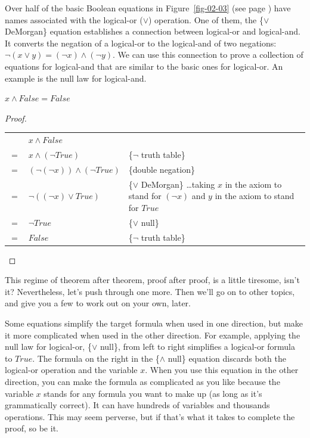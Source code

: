 Over half of the basic Boolean equations in Figure~\ref{fig-02-03} (see page \pageref{fig-02-03})
have names associated with the logical-or ($\vee$) operation.
One of them, the
\{$\vee$ DeMorgan\} equation establishes a connection between logical-or and logical-and.
It converts the negation of a logical-or to the logical-and of two negations:
$\neg(x \vee y) = (\neg x) \wedge (\neg y)$.
We can use this connection to prove a collection of equations for logical-and that are similar to the basic ones for logical-or.
An example is the null law for logical-and.

\begin{theorem}
$x \wedge False = False$
\end{theorem}

\begin{proof}
\mbox{} \\
\begin{tabular}{llp{3.15in}}
    & $x \wedge False$                       & \\
$=$ & $x \wedge (\neg True)$                 & \{$\neg$ truth table\} \\
$=$ & $(\neg (\neg x)) \wedge (\neg True)$   & \{double negation\} \\
$=$ & $\neg ((\neg x) \vee True)$            & \{$\vee$ DeMorgan\} \dots taking $x$ in the axiom to stand for $(\neg x)$ and $y$ in the axiom to stand for $True$  \\
$=$ & $\neg True$                            & \{$\vee$ null\} \\
$=$ & $False$                                & \{$\neg$ truth table\} \\
\end{tabular}

\end{proof}

This regime of theorem after theorem, proof after proof, is a little tiresome, isn't it?
Nevertheless, let's push through one more.
Then we'll go on to other topics, and give you a few to work out on your own, later.

Some equations simplify the target formula when used in one direction,
but make it more complicated when used in the other direction.
For example, applying
the null law for logical-or, \{$\vee$ null\}, from left to right simplifies a logical-or formula to $True$.
The formula on the right in the \{$\wedge$ null\} equation discards both the logical-or operation and the variable $x$.
When you use this equation in the other direction, you can make the formula as complicated as you like because the variable $x$ stands for any formula you want to make up (as long as it's grammatically correct).
It can have hundreds of variables and thousands operations.
This may seem perverse, but if that's what it takes to complete the proof, so be it.

